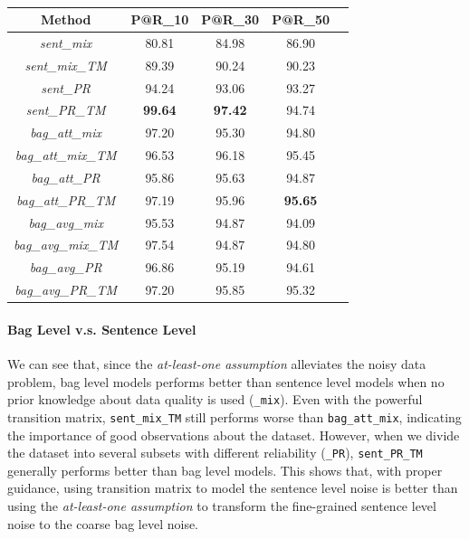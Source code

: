 \begin{table}
\centering
\small{
\begin{tabular}{|c|c|c|c|c|}
\hline
\textbf{Method}							& \textbf{P@R\_10} 		& \textbf{P@R\_30} 			& \textbf{P@R\_50} \\
\hline
\textit{sent\_mix} 						&80.81	&84.98	&86.90 	\\
\hline
\textit{sent\_mix\_TM} 				&89.39	&90.24	&90.23 	\\
\hline
\textit{sent\_PR} 						&94.24	&93.06	&93.27 	\\
\hline
\textit{sent\_PR\_TM} 				&\textbf{99.64}	&\textbf{97.42}	&94.74 	\\
\hline
\textit{bag\_att\_mix} 				&97.20	&95.30	&94.80 	\\
\hline
\textit{bag\_att\_mix\_TM} 		&96.53	&96.18	&95.45 	\\
\hline
\textit{bag\_att\_PR} 				&95.86	&95.63	&94.87 	\\
\hline
\textit{bag\_att\_PR\_TM} 			&97.19	&95.96	&\textbf{95.65} 	\\
\hline
\textit{bag\_avg\_mix} 				&95.53	&94.87	&94.09 	\\
\hline
\textit{bag\_avg\_mix\_TM} 		&97.54	&94.87	&94.80 	\\
\hline
\textit{bag\_avg\_PR} 				&96.86	&95.19	&94.61 	\\
\hline
\textit{bag\_avg\_PR\_TM} 			&97.20	&95.85	&95.32 	\\
\hline
\end{tabular}
}
\caption{}
\label{overall_TimeRE}
\end{table}

\paragraph{Bag Level v.s. Sentence Level}
 We can see that, since the \textit{at-least-one assumption} alleviates the noisy data problem, bag level models performs better than sentence level models when no prior knowledge about data quality is used (\texttt{\_mix}). Even with the powerful transition matrix, \texttt{sent\_mix\_TM} still performs worse than \texttt{bag\_att\_mix}, indicating the importance of good observations about the dataset. However, when we divide the dataset into several subsets with different reliability (\texttt{\_PR}), \texttt{sent\_PR\_TM} generally performs better than bag level models.
This shows that, with proper guidance, using transition matrix to model the sentence level noise is better than using the \textit{at-least-one assumption} to transform the fine-grained sentence level noise to the coarse bag level noise.



